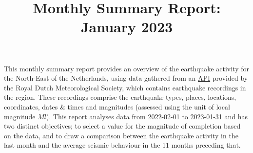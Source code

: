 \documentclass[a4paper]{article}
\author{}
\date{}
\title{Monthly Summary Report: January 2023\vspace{-3.5em}}
\begin{document}
\maketitle

\noindent This monthly summary report provides an overview of the earthquake activity for the North-East of the Netherlands, using data gathered from an \href{https://cdn.knmi.nl/knmi/map/page/seismologie/all_induced.json}{API} provided by the Royal Dutch Meteorological Society, which contains earthquake recordings in the region. These recordings comprise the earthquake types, places, locations, coordinates, dates \& times and magnitudes (assessed using the unit of local magnitude $Ml$). This report analyses data from 2022-02-01 to 2023-01-31 and has two distinct objectives; to select a value for the magnitude of completion based on the data, and to draw a comparison between the earthquake activity in the last month and the average seismic behaviour in the 11 months preceding that.
\end{document}
